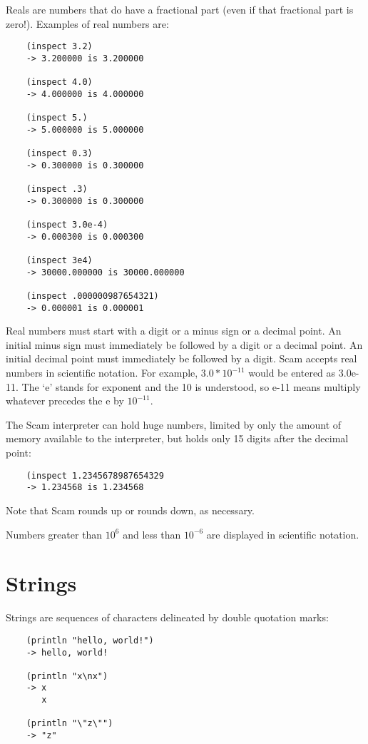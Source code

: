 Reals are numbers that do have a fractional part (even if that fractional
part is zero!). Examples of real numbers are:

\begin{verbatim}
    (inspect 3.2)
    -> 3.200000 is 3.200000
    
    (inspect 4.0)
    -> 4.000000 is 4.000000
       
    (inspect 5.)
    -> 5.000000 is 5.000000
       
    (inspect 0.3)
    -> 0.300000 is 0.300000
       
    (inspect .3)
    -> 0.300000 is 0.300000
    
    (inspect 3.0e-4)
    -> 0.000300 is 0.000300
    
    (inspect 3e4)
    -> 30000.000000 is 30000.000000
    
    (inspect .000000987654321)
    -> 0.000001 is 0.000001
\end{verbatim}

Real numbers must start with a digit or a minus sign or a decimal
point. An initial minus sign must immediately be followed by a digit or a
decimal point. An initial decimal point must immediately be followed by
a digit. Scam accepts real numbers in scientific notation. For example,
$3.0 * 10^{-11}$ would be entered as 3.0e-11. The `e' stands for exponent and
the 10 is understood, so e-11 means multiply whatever precedes the
e by $10^{-11}$.

The Scam interpreter can hold huge numbers,
limited by only the amount of memory available to the
interpreter,
but holds only 15 digits after the decimal point:

\begin{verbatim}
    (inspect 1.2345678987654329
    -> 1.234568 is 1.234568
\end{verbatim}

Note that Scam rounds up or rounds down, as necessary.

Numbers greater than $10^6$ and
less than $10^{-6}$ are displayed in
scientific notation.

\section{Strings}

Strings are sequences of characters delineated by double quotation marks:

\begin{verbatim}
    (println "hello, world!")
    -> hello, world!
    
    (println "x\nx")
    -> x
       x
    
    (println "\"z\"")
    -> "z" 
\end{verbatim}

